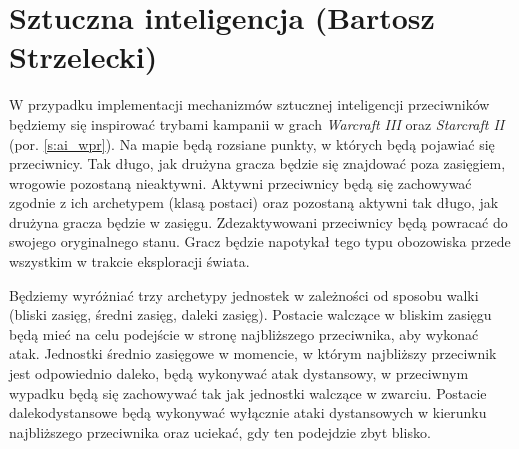 \section{Sztuczna inteligencja (Bartosz Strzelecki)}\label{s:ai_proj}
W przypadku implementacji mechanizmów sztucznej inteligencji przeciwników będziemy się inspirować trybami kampanii w grach \textit{Warcraft III} oraz \textit{Starcraft II} (por. \ref{s:ai_wpr}).
Na mapie będą rozsiane punkty, w których będą pojawiać się przeciwnicy. 
Tak długo, jak drużyna gracza będzie się znajdować poza zasięgiem, wrogowie pozostaną nieaktywni.
Aktywni przeciwnicy będą się zachowywać zgodnie z ich archetypem (klasą postaci) oraz pozostaną aktywni tak długo, jak drużyna gracza będzie w zasięgu.
Zdezaktywowani przeciwnicy będą powracać do swojego oryginalnego stanu. Gracz będzie napotykał tego typu obozowiska przede wszystkim w trakcie eksploracji świata.

Będziemy wyróżniać trzy archetypy jednostek w zależności od sposobu walki (bliski zasięg, średni zasięg, daleki zasięg).
Postacie walczące w bliskim zasięgu będą mieć na celu podejście w stronę najbliższego przeciwnika, aby wykonać atak.
Jednostki średnio zasięgowe w momencie, w którym najbliższy przeciwnik jest odpowiednio daleko, będą wykonywać atak dystansowy,
w przeciwnym wypadku będą się zachowywać tak jak jednostki walczące w zwarciu.
Postacie dalekodystansowe będą wykonywać wyłącznie ataki dystansowych w kierunku najbliższego przeciwnika oraz uciekać,
gdy ten podejdzie zbyt blisko.


